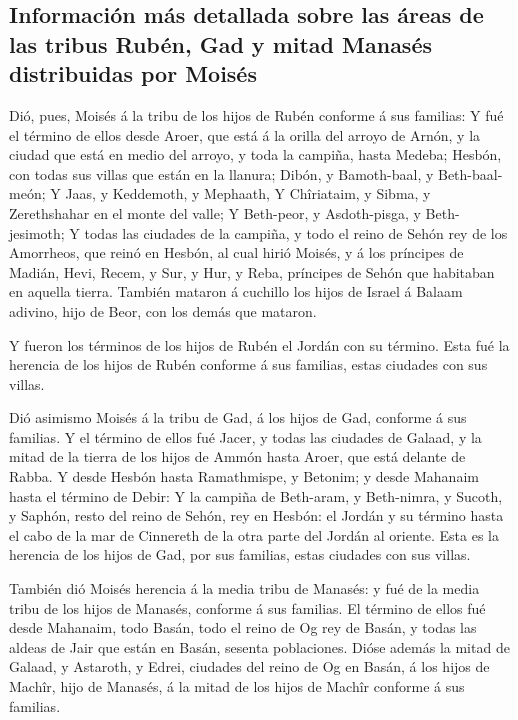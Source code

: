 \hypertarget{informaciuxf3n-muxe1s-detallada-sobre-las-uxe1reas-de-las-tribus-rubuxe9n-gad-y-mitad-manasuxe9s-distribuidas-por-moisuxe9s}{%
\subsection{Información más detallada sobre las áreas de las tribus
Rubén, Gad y mitad Manasés distribuidas por
Moisés}\label{informaciuxf3n-muxe1s-detallada-sobre-las-uxe1reas-de-las-tribus-rubuxe9n-gad-y-mitad-manasuxe9s-distribuidas-por-moisuxe9s}}

 Dió, pues, Moisés á la tribu de los hijos de Rubén
conforme á sus familias:  Y fué el término de ellos desde
Aroer, que está á la orilla del arroyo de Arnón, y la ciudad que está en
medio del arroyo, y toda la campiña, hasta Medeba; 
Hesbón, con todas sus villas que están en la llanura; Dibón, y
Bamoth-baal, y Beth-baal-meón;  Y Jaas, y Keddemoth, y
Mephaath,  Y Chîriataim, y Sibma, y Zerethshahar en el
monte del valle;  Y Beth-peor, y Asdoth-pisga, y
Beth-jesimoth;  Y todas las ciudades de la campiña, y
todo el reino de Sehón rey de los Amorrheos, que reinó en Hesbón, al
cual hirió Moisés, y á los príncipes de Madián, Hevi, Recem, y Sur, y
Hur, y Reba, príncipes de Sehón que habitaban en aquella tierra.
 También mataron á cuchillo los hijos de Israel á Balaam
adivino, hijo de Beor, con los demás que mataron.

 Y fueron los términos de los hijos de Rubén el Jordán
con su término. Esta fué la herencia de los hijos de Rubén conforme á
sus familias, estas ciudades con sus villas.

 Dió asimismo Moisés á la tribu de Gad, á los hijos de
Gad, conforme á sus familias.  Y el término de ellos fué
Jacer, y todas las ciudades de Galaad, y la mitad de la tierra de los
hijos de Ammón hasta Aroer, que está delante de Rabba.  Y
desde Hesbón hasta Ramathmispe, y Betonim; y desde Mahanaim hasta el
término de Debir:  Y la campiña de Beth-aram, y
Beth-nimra, y Sucoth, y Saphón, resto del reino de Sehón, rey en Hesbón:
el Jordán y su término hasta el cabo de la mar de Cinnereth de la otra
parte del Jordán al oriente.  Esta es la herencia de los
hijos de Gad, por sus familias, estas ciudades con sus villas.

 También dió Moisés herencia á la media tribu de Manasés:
y fué de la media tribu de los hijos de Manasés, conforme á sus
familias.  El término de ellos fué desde Mahanaim, todo
Basán, todo el reino de Og rey de Basán, y todas las aldeas de Jair que
están en Basán, sesenta poblaciones.  Dióse además la
mitad de Galaad, y Astaroth, y Edrei, ciudades del reino de Og en Basán,
á los hijos de Machîr, hijo de Manasés, á la mitad de los hijos de
Machîr conforme á sus familias.

